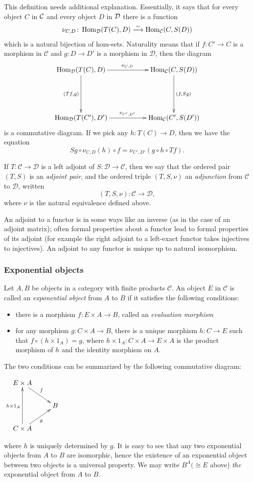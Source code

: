 \documentclass[10pt]{article}
\theoremstyle{plain}
\theoremstyle{definition}
\theoremstyle{remark}
\def\Hom{\mathop{\rm Hom}\nolimits}
\begin{document}
This definition needs additional explanation.  Essentially, it says that for every object $C$ in $\cal{C}$ and every object $D$ in $\cal{D}$ there is a function
\[
\nu_{C,D} \colon \Hom_{\mathcal{D}}(T(C),D) \overset{\sim}{\longrightarrow} \Hom_{\mathcal{C}}(C,S(D))
\]
which is a natural bijection of hom-sets.  Naturality means that if $f\colon C'\to C$ is a morphism in $\mathcal{C}$ and $g\colon D\to D'$ is a morphism in $\mathcal{D}$, then the diagram
\[\xymatrix{
\Hom_{\mathcal{D}}(T(C),D)\ar[dd]_{(Tf,g)}\ar[rr]^{\nu_{C,D}} &&
\Hom_{\mathcal{C}}(C,S(D))\ar[dd]^{(f,Sg)} \\ && \\
\Hom_{\mathcal{D}}(T(C'),D')\ar[rr]^{\nu_{C',D'}} &&
\Hom_{\mathcal{C}}(C',S(D')) \\
}\]
is a commutative diagram.  If we pick any $h:T(C)\to D$, then we have the equation $$Sg\circ \nu_{C,D}(h)\circ f= \nu_{C',D'}(g\circ h\circ Tf).$$

If $T:\mathcal{C}\to\mathcal{D}$ is a left adjoint of $S:\mathcal{D}\to \mathcal{C}$, then we say that the ordered pair $(T,S)$ is an \emph{adjoint pair}, and the ordered triple $(T,S,\nu)$ an \emph{adjunction} from $\mathcal{C}$ to $\mathcal{D}$, written $$(T,S,\nu):\mathcal{C}\to \mathcal{D},$$ where $\nu$ is the natural equivalence defined above.

An adjoint to a functor is in some ways like an inverse (as in the case of an adjoint matrix); often formal properties about a functor lead to formal properties of its adjoint (for example the right adjoint to a left-exact functor takes injectives to injectives).  An adjoint to any functor is unique up to natural isomorphism.

\subsubsection{Exponential objects}
Let $A,B$ be objects in a category with finite products $\mathcal{C}$.  An object $E$ in $\mathcal{C}$ is called an \emph{exponential object} from $A$ to $B$ if it satisfies the following conditions:
\begin{itemize}
\item there is a morphism $f:E\times A\to B$, called an \emph{evaluation morphism}
\item for any morphism $g:C\times A\to B$, there is a unique morphism $h:C\to E$ such that $f\circ (h\times 1_A)=g$, where $h\times 1_A:C\times A\to E\times A$ is the product morphism of $h$ and the identity morphism on $A$.
\end{itemize}
The two conditions can be summarized by the following commutative diagram:
\begin{center}
$
\xymatrix@R-=20pt{
E\times A\ar[dr]^f\\
&B\\
C\times A\ar[ur]_g\ar[uu]^{h\times 1_A}
}
$
\end{center}
where $h$ is uniquely determined by $g$.  It is easy to see that any two exponential objects from $A$ to $B$ are isomorphic, hence the existence of an exponential object between two objects is a universal property.  We may write $B^A (\cong E$ above) \emph{the} exponential object from $A$ to $B$.
\end{document}
